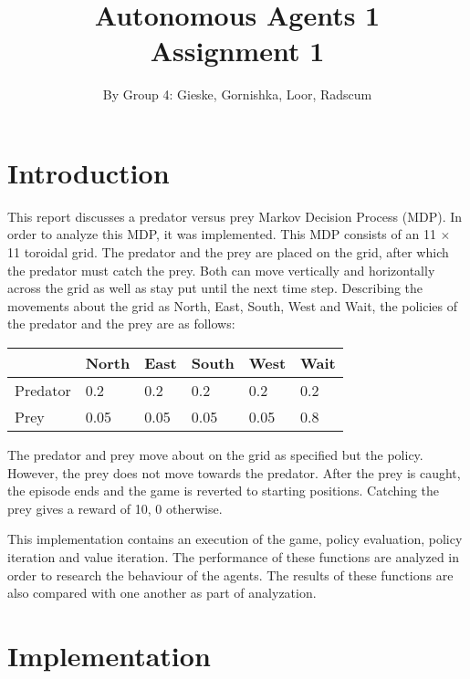 \documentclass{article}
\begin{document}
\title{Autonomous Agents 1 \\ Assignment 1}

\author{By Group 4: Gieske, Gornishka, Loor, Radscum}
\maketitle

\pagebreak

\section*{Introduction}
This report discusses a predator versus prey Markov Decision Process (MDP). In order to analyze this MDP, it was implemented. This MDP consists of an 11 $\times$ 11 toroidal grid. The predator and the prey are placed on the grid, after which the  predator must catch the prey. Both can move vertically and horizontally across the grid as well as stay put until the next time step. Describing the movements about the grid as North, East, South, West and Wait, the policies of the predator and the prey are as follows:
\begin{center}
	\begin{tabular}{ | l | l | l | l | l | l |}
	\hline
	& North & East & South & West & Wait\\
	\hline
	Predator & 0.2 & 0.2 & 0.2 & 0.2 & 0.2 \\ 
	\hline
	Prey & 0.05 & 0.05 & 0.05 & 0.05 & 0.8 \\
	\hline
	\end{tabular}
\end{center}
The predator and prey move about on the grid as specified but the policy. However, the prey does not move towards the predator. After the prey is caught, the episode ends and the game is reverted to starting positions. Catching the prey gives a reward of 10, 0 otherwise.

This implementation contains an execution of the game, policy evaluation, policy iteration and value iteration. The performance of these functions are analyzed in order to research the behaviour of the agents. The results of these functions are also compared with one another as part of analyzation.

\pagebreak

\section*{Implementation}
\end{document}
